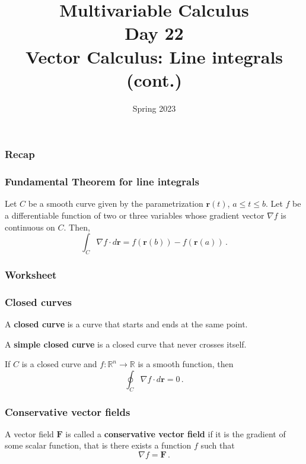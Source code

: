 \documentclass[aspectratio=169]{beamer}
\title{ Multivariable Calculus \\ Day  22 \\ Vector Calculus: Line integrals (cont.)}
\date{Spring 2023}
\begin{document}
\maketitle


\begin{frame}
    \frametitle{Recap}
\end{frame}



\begin{frame}
    \frametitle{Fundamental Theorem for line integrals}
    \begin{theorem}
    Let \(C\) be a smooth curve given by the parametrization \(\mathbf{r}(t)\),
    \(a \leq t \leq b\).
    Let \(f\) be a differentiable function of two or three
    variables whose gradient vector \(\nabla f\) is continuous on \(C\).
    Then,
    \begin{equation*}
        \int_C \nabla f \cdot d\mathbf{r} = f(\mathbf{r}(b)) - f(\mathbf{r}(a)) \,.
    \end{equation*}
    \end{theorem}
\end{frame}


\begin{frame}
    \frametitle{Worksheet}
\end{frame}

\begin{frame}
    \frametitle{Closed curves}
    \begin{definition}
    A \textbf{closed curve} is a curve that starts and ends at the same point.

    A \textbf{simple closed curve} is a closed curve that never crosses itself.
    \end{definition}
\end{frame}

\begin{frame}
\begin{corollary}
If \(C\) is a closed curve and \(f:\mathbb{R}^n \to \mathbb{R}\) is a smooth function,
then
\begin{equation*}
    \oint_C \nabla f \cdot d\mathbf{r}  = 0 \,.
\end{equation*}
\end{corollary}
\end{frame}

\begin{frame}
    \frametitle{Conservative vector fields}
\begin{definition}
A vector field \(\mathbf{F}\) is called a \textbf{conservative vector field}
if it is the gradient of some scalar function, that is there exists
a function \(f\) such that
\begin{equation*}
    \nabla f = \mathbf{F} \,.
\end{equation*}
\end{definition}
\end{frame}
\end{document}
